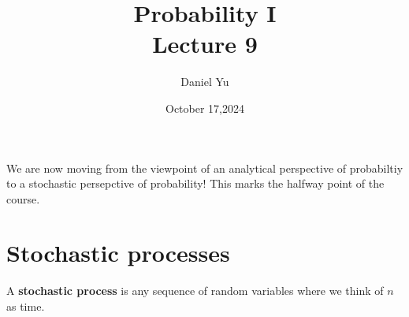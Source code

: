 \documentclass[a4paper]{article}
\title{\Huge{Probability I}\\Lecture 9}
\author{\huge{Daniel Yu}}
\date{October 17,2024}
\begin{document}
\maketitle
\newpage%
\tableofcontents
\pagebreak
  We are now moving from the viewpoint of an analytical perspective of probabiltiy to a stochastic persepctive of probability! This marks the halfway point of the course.

  \section{Stochastic processes}
  \begin{definition}
    A \textbf{stochastic process} is any sequence of random variables where we think of $n$ as time. 
  \end{definition}
\end{document}
